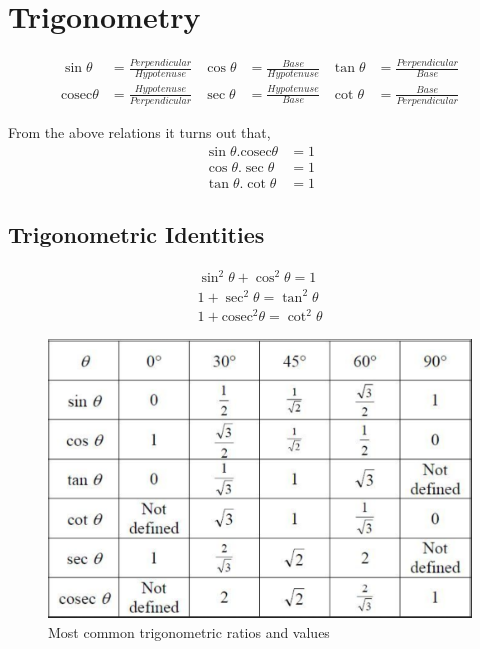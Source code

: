 \section{Trigonometry}
\begin{align*}
\sin\theta &= \frac{Perpendicular}{Hypotenuse} & \cos\theta &= \frac{Base}{Hypotenuse} & \tan\theta &= \frac{Perpendicular}{Base} \\
\mathrm{cosec}\theta &= \frac{Hypotenuse}{Perpendicular} & \sec\theta &= \frac{Hypotenuse}{Base} & \cot\theta &= \frac{Base}{Perpendicular}
\end{align*}

From the above relations it turns out that,
\begin{align*}
\sin\theta . \mathrm{cosec}\theta &= 1 \\
\cos\theta . \sec\theta &= 1 \\
\tan\theta . \cot\theta &= 1 
\end{align*}

\subsection{Trigonometric Identities}
\begin{align}
\sin^2\theta + \cos^2\theta = 1 \\
1 + \sec^2\theta = \tan^2\theta \\
1 + \mathrm{cosec}^2\theta = \cot^2\theta
\end{align}

\begin{figure}[ht]
    \centering
    \includegraphics[scale = 0.75]{trigonometry_table}
    \caption{Most common trigonometric ratios and values}
    \label{trigonometry_values}
\end{figure}

